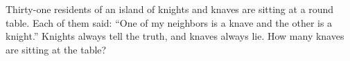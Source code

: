 Thirty-one residents of an island of knights and knaves are sitting at a round table. Each of them said: ``One of my neighbors is a knave and the other is a knight.'' Knights always tell the truth, and knaves always lie. How many knaves are sitting at the table?
